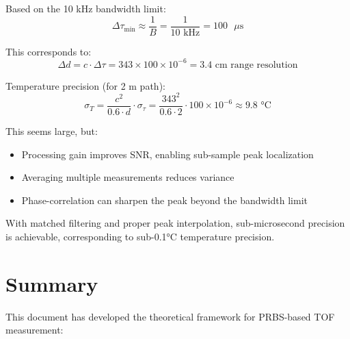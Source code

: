 \documentclass[11pt]{article}
\begin{document}
Based on the 10 kHz bandwidth limit:
\begin{equation}
\Delta\tau_{\min} \approx \frac{1}{B} = \frac{1}{10\text{ kHz}} = 100 \text{ }\mu\text{s}
\end{equation}

This corresponds to:
\begin{equation}
\Delta d = c \cdot \Delta\tau = 343 \times 100 \times 10^{-6} = 3.4 \text{ cm range resolution}
\end{equation}

Temperature precision (for 2 m path):
\begin{equation}
\sigma_T = \frac{c^2}{0.6 \cdot d} \cdot \sigma_\tau = \frac{343^2}{0.6 \cdot 2} \cdot 100 \times 10^{-6} \approx 9.8 \text{ °C}
\end{equation}

This seems large, but:
\begin{itemize}
    \item Processing gain improves SNR, enabling sub-sample peak localization
    \item Averaging multiple measurements reduces variance
    \item Phase-correlation can sharpen the peak beyond the bandwidth limit
\end{itemize}

With matched filtering and proper peak interpolation, sub-microsecond precision is achievable, corresponding to sub-0.1°C temperature precision.

\section{Summary}

This document has developed the theoretical framework for PRBS-based TOF measurement:
\end{document}
